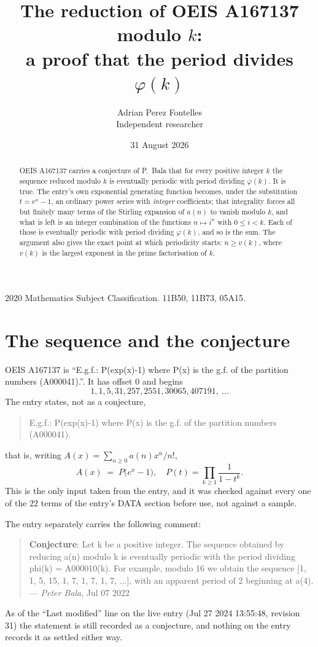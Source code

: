 \documentclass[11pt,a4paper]{article}
\title{The reduction of OEIS A167137 modulo $k$:\\ a proof that the period divides
$\varphi(k)$}
\author{Adrian Perez Fontelles\\ \small Independent researcher}
\date{31 August 2026}
\theoremstyle{plain}
\theoremstyle{definition}
\begin{document}
\maketitle

\begin{abstract}
OEIS A167137 carries a conjecture of P.~Bala that for every positive integer $k$ the
sequence reduced modulo $k$ is eventually periodic with period dividing $\varphi(k)$.
It is true. The entry's own exponential generating function becomes, under the
substitution $t=e^{x}-1$, an ordinary power series with \emph{integer} coefficients;
that integrality forces all but finitely many terms of the Stirling expansion of $a(n)$
to vanish modulo $k$, and what is left is an integer combination of the functions
$n\mapsto i^{n}$ with $0\le i<k$. Each of those is eventually periodic with period
dividing $\varphi(k)$, and so is the sum. The argument also gives the exact point at
which periodicity starts: $n\ge v(k)$, where $v(k)$ is the largest exponent in the
prime factorisation of $k$.
\end{abstract}

\noindent\small 2020 Mathematics Subject Classification. 11B50, 11B73, 05A15.\normalsize

\section{The sequence and the conjecture}

OEIS A167137 is ``E.g.f.: P(exp(x)-1) where P(x) is the g.f. of the partition numbers (A000041).''. It has offset $0$ and begins
\[
1, 1, 5, 31, 257, 2551, 30065, 407191,\ \dots
\]
The entry states, not as a conjecture,
\begin{quote}\small
E.g.f.: P(exp(x)-1) where P(x) is the g.f. of the partition numbers (A000041).
\end{quote}
that is, writing $A(x)=\sum_{n\ge 0}a(n)x^{n}/n!$,
\begin{equation}\label{eq:egf}
A(x)\;=\;P\bigl(e^{x}-1\bigr),\quad P(t)=\prod_{k\ge 1}\frac{1}{1-t^{k}}.
\end{equation}
This is the only input taken from the entry, and it was checked against every one of the
$22$ terms of the entry's DATA section before use, not against a sample.

The entry separately carries the following comment:
\begin{quote}\small
\textbf{Conjecture}: Let k be a positive integer. The sequence obtained by reducing a(n) modulo k is eventually periodic with the period dividing phi(k) = A000010(k). For example, modulo 16 we obtain the sequence [1, 1, 5, 15, 1, 7, 1, 7, 1, 7, ...], with an apparent period of 2 beginning at a(4). --- \emph{Peter Bala}, Jul 07 2022
\end{quote}
As of the ``Last modified'' line on the live entry (Jul 27 2024 13:55:48, revision
31) the statement is still recorded as a conjecture, and nothing on the entry
records it as settled either way.
\end{document}
